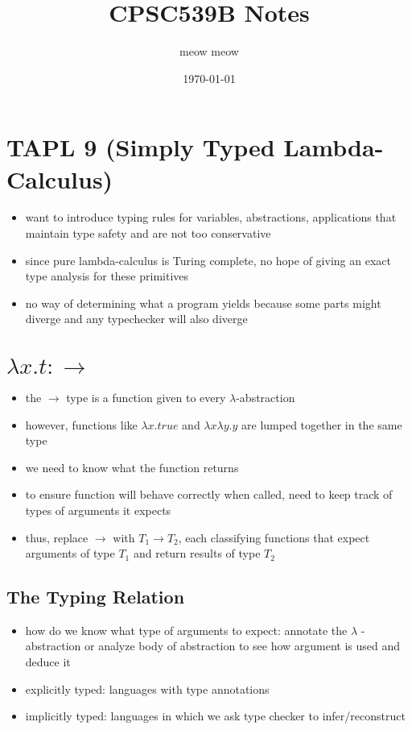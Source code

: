 \documentclass[11pt]{article}
\author{meow meow}
\date{\today}
\title{CPSC539B Notes}
\begin{document}
\maketitle
\tableofcontents


\section{TAPL 9 (Simply Typed Lambda-Calculus)}
\label{sec:orge60f8d7}
\begin{itemize}
\item want to introduce typing rules for variables, abstractions, applications that maintain type safety and are not too conservative
\item since pure lambda-calculus is Turing complete, no hope of giving an exact type analysis for these primitives
\item no way of determining what a program yields because some parts might diverge and any typechecker will also diverge
\end{itemize}

\section{\(\lambda  x.t : \rightarrow\)}
\label{sec:orga660a4c}
\begin{itemize}
\item the $\rightarrow$ type is a function given to every $\lambda$-abstraction
\item however, functions like \(\lambda x.true\) and \(\lambda x \lambda y.y\) are lumped together in the same type
\item we need to know what the function returns
\item to ensure function will behave correctly when called, need to keep track of types of arguments it expects
\item thus, replace \(\rightarrow\) with \(T_1 \rightarrow T_2\), each classifying functions that expect arguments of type \(T_1\) and return results of type \(T_2\)
\end{itemize}

\subsection{The Typing Relation}
\label{sec:org94ca3aa}
\begin{itemize}
\item how do we know what type of arguments to expect: annotate the \(\lambda\) -abstraction or analyze body of abstraction to see how argument is used and deduce it
\item explicitly typed: languages with type annotations
\item implicitly typed: languages in which we ask type checker to infer/reconstruct
\end{itemize}
\end{document}

